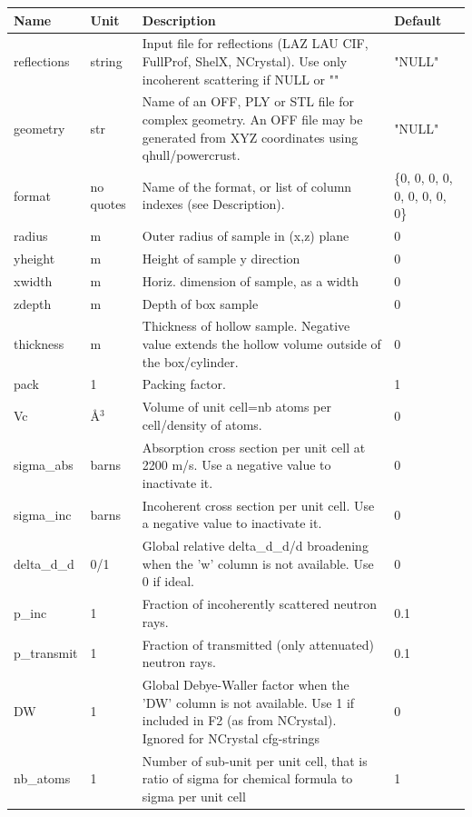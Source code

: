 \begin{longtable}{p{}p{}p{}p{}}
\toprule
\textbf{Name} & \textbf{Unit} & \textbf{Description} & \textbf{Default} \\
\midrule
\endhead
reflections & string & Input file for reflections (LAZ LAU CIF, FullProf, ShelX, NCrystal). Use only incoherent scattering if NULL or "" & "NULL" \\
geometry & str & Name of an OFF, PLY or STL file for complex geometry. An OFF file may be generated from XYZ coordinates using qhull/powercrust. & "NULL" \\
format & no quotes & Name of the format, or list of column indexes (see Description). & \{0, 0, 0, 0, 0, 0, 0, 0, 0\} \\
radius & m & Outer radius of sample in (x,z) plane & 0 \\
yheight & m & Height of sample y direction & 0 \\
xwidth & m & Horiz. dimension of sample, as a width & 0 \\
zdepth & m & Depth of box sample & 0 \\
thickness & m & Thickness of hollow sample. Negative value extends the hollow volume outside of the box/cylinder. & 0 \\
pack & 1 & Packing factor. & 1 \\
Vc & \AA{}$^{3}$ & Volume of unit cell=nb atoms per cell/density of atoms. & 0 \\
sigma\_abs & barns & Absorption cross section per unit cell at 2200 m/s. Use a negative value to inactivate it. & 0 \\
sigma\_inc & barns & Incoherent cross section per unit cell. Use a negative value to inactivate it. & 0 \\
delta\_d\_d & 0/1 & Global relative delta\_d\_d/d broadening when the 'w' column is not available. Use 0 if ideal. & 0 \\
p\_inc & 1 & Fraction of incoherently scattered neutron rays. & 0.1 \\
p\_transmit & 1 & Fraction of transmitted (only attenuated) neutron rays. & 0.1 \\
DW & 1 & Global Debye-Waller factor when the 'DW' column is not available. Use 1 if included in F2 (as from NCrystal). Ignored for NCrystal cfg-strings & 0 \\
nb\_atoms & 1 & Number of sub-unit per unit cell, that is ratio of sigma for chemical formula to sigma per unit cell & 1 \\

\end{longtable}
